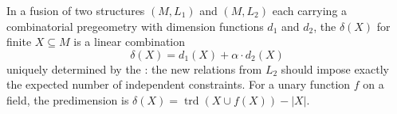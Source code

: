 In a fusion of two structures $(M, L_1)$ and $(M, L_2)$ each carrying a combinatorial pregeometry with dimension functions $d_1$ and $d_2$, the  $\delta(X)$ for finite $X \subseteq M$ is a linear combination
$$\delta(X) = d_1(X) + \alpha \cdot d_2(X)$$
uniquely determined by the : the new relations from $L_2$ should impose exactly the expected number of independent constraints. For a unary function $f$ on a field, the predimension is $\delta(X) = \operatorname{trd}(X \cup f(X)) - |X|$.
